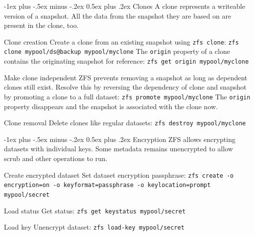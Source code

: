 \documentclass[10pt,landscape,letter]{article}
\makeatletter
\renewcommand{\section}{\@startsection{section}{1}{0mm}%
                                {-1ex plus -.5ex minus -.2ex}%
                                {0.5ex plus .2ex}%
                                {\normalfont\large\bfseries}}
\makeatother
\begin{document}
\begin{multicols}{3}
	\section{Clones}
  A clone represents a writeable version of a snapshot. All the data from the
  snapshot they are based on are present in the clone, too.
	\begin{Description}
    \item[Clone creation] Create a clone from an existing snapshot using \texttt{zfs clone}:
      \texttt{zfs clone mypool/ds@backup mypool/myclone}
      The \texttt{origin} property of a clone contains the originating snapshot for reference: \texttt{zfs get origin mypool/myclone}
    \item[Make clone independent] ZFS prevents removing a snapshot as long as
      dependent clones still exist. Resolve this by reversing the dependency of clone and
      snapshot by promoting a clone to a full dataset: \texttt{zfs promote mypool/myclone}
      The \texttt{origin} property disappears and the snapshot is associated with the clone now.
    \item[Clone removal] Delete clones like regular datasets: \texttt{zfs destroy mypool/myclone}
	\end{Description}

  \section{Encryption}
  ZFS allows encrypting datasets with individual keys. Some metadata remains unencrypted to allow scrub and other operations to run.
	\begin{Description}
    \item[Create encrypted dataset] Set dataset encryption passphrase: \texttt{zfs create -o encryption=on -o keyformat=passphrase -o keylocation=prompt mypool/secret}
    \item[Load status] Get status: \texttt{zfs get keystatus mypool/secret}
    \item[Load key] Unencrypt dataset: \texttt{zfs load-key mypool/secret}
	\end{Description}



\end{multicols}
\end{document}
